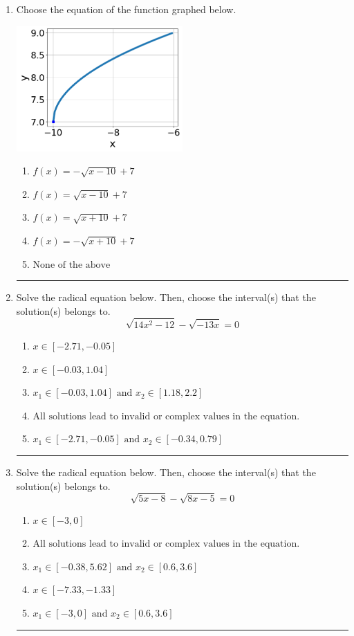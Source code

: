 \documentclass[14pt]{extbook}
\newcommand{\litem}[1]{\item#1\hspace*{-1cm}\rule{\textwidth}{0.4pt}}
\begin{document}
\begin{enumerate}
{\begin{enumerate}[label=\Alph*.]
\end{enumerate} }
\litem{
Choose the equation of the function graphed below.
\begin{center}
    \includegraphics[width=0.5\textwidth]{../Figures/radicalGraphToEquationCopyB.png}
\end{center}
\begin{enumerate}[label=\Alph*.]
\item \( f(x) = - \sqrt{x - 10} + 7 \)
\item \( f(x) = \sqrt{x - 10} + 7 \)
\item \( f(x) = \sqrt{x + 10} + 7 \)
\item \( f(x) = - \sqrt{x + 10} + 7 \)
\item \( \text{None of the above} \)

\end{enumerate} }
\litem{
Solve the radical equation below. Then, choose the interval(s) that the solution(s) belongs to.\[ \sqrt{14 x^2 - 12} - \sqrt{-13 x} = 0 \]\begin{enumerate}[label=\Alph*.]
\item \( x \in [-2.71,-0.05] \)
\item \( x \in [-0.03,1.04] \)
\item \( x_1 \in [-0.03, 1.04] \text{ and } x_2 \in [1.18,2.2] \)
\item \( \text{All solutions lead to invalid or complex values in the equation.} \)
\item \( x_1 \in [-2.71, -0.05] \text{ and } x_2 \in [-0.34,0.79] \)

\end{enumerate} }
\litem{
Solve the radical equation below. Then, choose the interval(s) that the solution(s) belongs to.\[ \sqrt{5 x - 8} - \sqrt{8 x - 5} = 0 \]\begin{enumerate}[label=\Alph*.]
\item \( x \in [-3,0] \)
\item \( \text{All solutions lead to invalid or complex values in the equation.} \)
\item \( x_1 \in [-0.38, 5.62] \text{ and } x_2 \in [0.6,3.6] \)
\item \( x \in [-7.33,-1.33] \)
\item \( x_1 \in [-3, 0] \text{ and } x_2 \in [0.6,3.6] \)


\end{enumerate}}
\end{enumerate}
\end{document}
